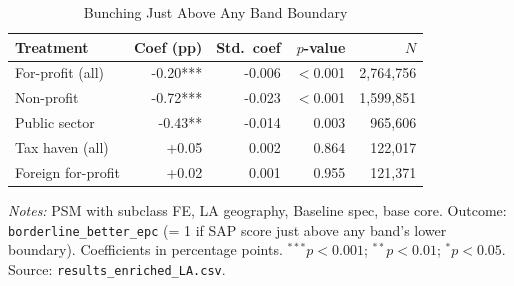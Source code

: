 \begin{table}[htbp]
\centering
\caption{Bunching Just Above Any Band Boundary}
\label{tab:h3_borderline_better}
\begin{tabular}{lrrrr}
\toprule
Treatment & Coef (pp) & Std.\ coef & $p$-value & $N$ \\
\midrule
For-profit (all) & -0.20*** & -0.006 & $<$0.001 & 2,764,756 \\
Non-profit & -0.72*** & -0.023 & $<$0.001 & 1,599,851 \\
Public sector & -0.43** & -0.014 & 0.003 & 965,606 \\
Tax haven (all) & +0.05 & 0.002 & 0.864 & 122,017 \\
Foreign for-profit & +0.02 & 0.001 & 0.955 & 121,371 \\
\bottomrule
\end{tabular}
\begin{minipage}{0.9\textwidth}
\vspace{4pt}
\footnotesize
\textit{Notes:} PSM with subclass FE, LA geography, Baseline spec, base core.
Outcome: \texttt{borderline\_better\_epc} (= 1 if SAP score just above any band's lower boundary).
Coefficients in percentage points.
$^{***}p<0.001$; $^{**}p<0.01$; $^{*}p<0.05$.
Source: \texttt{results\_enriched\_LA.csv}.
\end{minipage}
\end{table}
